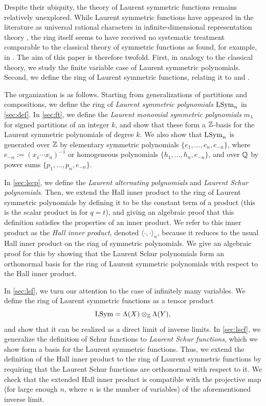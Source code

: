 \documentclass[11pt]{amsart}
\begin{document}
Despite their ubiquity, the theory of Laurent symmetric functions remains relatively unexplored. While Laurent symmetric functions have appeared in the literature as universal rational characters in infinite-dimensional representation theory \cite{Koi89}, the ring itself seems to have received no systematic treatment comparable to the classical theory of symmetric functions as found, for example, in \cite{Mac15, Ful97, Lit06}. The aim of this paper is therefore twofold. First, in analogy to the classical theory, we study the finite variable case of Laurent symmetric polynomials. Second, we define the ring of Laurent symmetric functions, relating it to \cite{Koi89} and \cite{Ful97}.

The organization is as follows. Starting from generalizations of partitions and compositions, we define the ring of \textit{Laurent symmetric polynomials} $\mathrm{LSym}_n$ in \cref{sec:def}. In \cref{sec:ft}, we define the \textit{Laurent monomial symmetric polynomials} $m_\lambda$ for signed partitions of an integer $k$, and show that these form a $\mathbb{Z}$-basis for the Laurent symmetric polynomials of degree $k$. We also show that $\mathrm{LSym}_n$ is generated over $\mathbb{Z}$ by  elementary symmetric polynomials $\{e_1,\dots,e_n,e_{-n}\}$, where $e_{-n}:=(x_1\cdots x_n)^{-1}$ or homogeneous polynomials $\{h_1,\dots,h_n,e_{-n}\}$, and over $\mathbb{Q}$ by power sums $\{p_1,\dots,p_n,e_{-n}\}$. 

In \cref{sec:lscp}, we define the \textit{Laurent alternating polynomials} and \textit{Laurent Schur polynomials}. Then, we extend the Hall inner product to the ring of Laurent symmetric polynomials by defining it to be the constant term of a product (this is the scalar product in \cite[Ch.~VI \S9]{Mac15} for $q=t$), and giving an algebraic proof that this definition satisfies the properties of an inner product. We refer to this inner product as the \textit{Hall inner product}, denoted $\langle \cdot, \cdot \rangle_n$, because it reduces to the usual Hall inner product on  the ring of symmetric polynomials. We give an algebraic proof for this by showing that the Laurent Schur polynomials form an orthonormal basis for the ring of Laurent symmetric polynomials with respect to the Hall inner product. 

In \cref{sec:lsf}, we turn our attention to the case of infinitely many variables. We define the ring of Laurent symmetric functions as a tensor product \[\mathrm{LSym} = \Lambda(X) \otimes_{\mathbb{Z}}\Lambda(Y),\] and show that it can be realized as a direct limit of inverse limits. In \cref{sec:lscf}, we generalize the definition of Schur functions to \textit{Laurent Schur functions}, which we show form a basis for the Laurent symmetric functions. Thus, we extend the definition of the Hall inner product to the ring of Laurent symmetric functions by requiring that the Laurent Schur functions are orthonormal with respect to it. We check that the extended Hall inner product is compatible with the projective map (for large enough $n$, where $n$ is the number of variables) of the aforementioned inverse limit.
\end{document}
